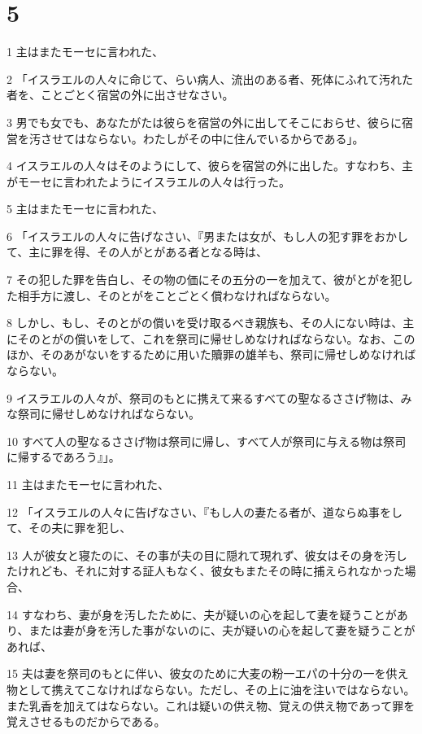 \chapter{5}

\par 1 主はまたモーセに言われた、
\par 2 「イスラエルの人々に命じて、らい病人、流出のある者、死体にふれて汚れた者を、ことごとく宿営の外に出させなさい。
\par 3 男でも女でも、あなたがたは彼らを宿営の外に出してそこにおらせ、彼らに宿営を汚させてはならない。わたしがその中に住んでいるからである」。
\par 4 イスラエルの人々はそのようにして、彼らを宿営の外に出した。すなわち、主がモーセに言われたようにイスラエルの人々は行った。
\par 5 主はまたモーセに言われた、
\par 6 「イスラエルの人々に告げなさい、『男または女が、もし人の犯す罪をおかして、主に罪を得、その人がとがある者となる時は、
\par 7 その犯した罪を告白し、その物の価にその五分の一を加えて、彼がとがを犯した相手方に渡し、そのとがをことごとく償わなければならない。
\par 8 しかし、もし、そのとがの償いを受け取るべき親族も、その人にない時は、主にそのとがの償いをして、これを祭司に帰せしめなければならない。なお、このほか、そのあがないをするために用いた贖罪の雄羊も、祭司に帰せしめなければならない。
\par 9 イスラエルの人々が、祭司のもとに携えて来るすべての聖なるささげ物は、みな祭司に帰せしめなければならない。
\par 10 すべて人の聖なるささげ物は祭司に帰し、すべて人が祭司に与える物は祭司に帰するであろう』」。
\par 11 主はまたモーセに言われた、
\par 12 「イスラエルの人々に告げなさい、『もし人の妻たる者が、道ならぬ事をして、その夫に罪を犯し、
\par 13 人が彼女と寝たのに、その事が夫の目に隠れて現れず、彼女はその身を汚したけれども、それに対する証人もなく、彼女もまたその時に捕えられなかった場合、
\par 14 すなわち、妻が身を汚したために、夫が疑いの心を起して妻を疑うことがあり、または妻が身を汚した事がないのに、夫が疑いの心を起して妻を疑うことがあれば、
\par 15 夫は妻を祭司のもとに伴い、彼女のために大麦の粉一エパの十分の一を供え物として携えてこなければならない。ただし、その上に油を注いではならない。また乳香を加えてはならない。これは疑いの供え物、覚えの供え物であって罪を覚えさせるものだからである。
